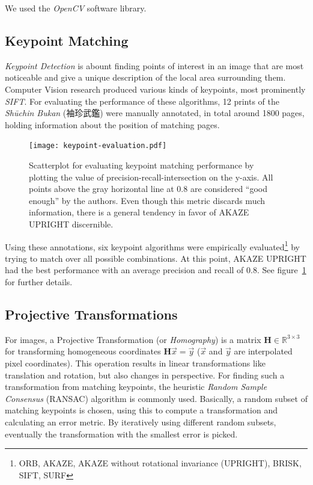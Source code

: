 \documentclass{ltjarticle}
\begin{document}
We used the \emph{OpenCV} software library.\cite{opencv_library}

\subsection{Keypoint Matching}

\emph{Keypoint Detection}\cite[Ch.4]{szeliski2010computer} is abount finding points of interest in an image that are most noticeable and give a unique description of the local area surrounding them. Computer Vision research produced various kinds of keypoints, most prominently \emph{SIFT}.\cite{lowe2004sift} For evaluating the performance of these algorithms, 12 prints of the \emph{Shūchin Bukan} (袖珍武鑑) were manually annotated, in total around 1800 pages, holding information about the position of matching pages.

\begin{figure}[p]
    \centering
    \texttt{[image: keypoint-evaluation.pdf]}
    \caption[Scatterplot of keypoint matching performance]{Scatterplot for evaluating keypoint matching performance by plotting the value of precision-recall-intersection on the y-axis. All points above the gray horizontal line at $0.8$ are considered “good enough” by the authors. Even though this metric discards much information, there is a general tendency in favor of AKAZE UPRIGHT discernible.}
    \label{fig:keypoint-evaluation}
\end{figure}

Using these annotations, six keypoint algorithms were empirically evaluated\footnote{ORB\cite{rublee2011orb}, AKAZE\cite{alcantarilla2011fast}, AKAZE without rotational invariance (UPRIGHT), BRISK\cite{leutenegger2011brisk}, SIFT, SURF\cite{bay2006surf}} by trying to match over all possible combinations. At this point, AKAZE UPRIGHT had the best performance with an average precision and recall of $0.8$. See figure~\ref{fig:keypoint-evaluation} for further details.

\subsection{Projective Transformations}

For images, a Projective Transformation (or \emph{Homography}) is a matrix $\mathbf{H} \in \mathbb{R}^{3 \times 3}$ for transforming homogeneous coordinates $\mathbf{H}\vec{x} = \vec{y}$ ($\vec{x}$ and $\vec{y}$ are interpolated pixel coordinates). This operation results in linear transformations like translation and rotation, but also changes in perspective.\cite{marschner2015fundamentals} For finding such a transformation from matching keypoints, the heuristic \emph{Random Sample Consensus} (RANSAC) algorithm is commonly used.\cite{fischler1981random} Basically, a random subset of matching keypoints is chosen, using this to compute a transformation and calculating an error metric. By iteratively using different random subsets, eventually the transformation with the smallest error is picked.
\end{document}
